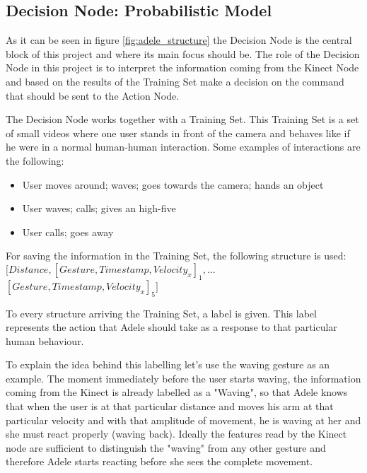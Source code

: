 

\subsection{Decision Node: Probabilistic Model}
As it can be seen in figure \ref{fig:adele_structure} the Decision Node is the central block of this project and where its main focus should be. The role of the Decision Node in this project is to interpret the information coming from the Kinect Node and based on the results of the Training Set make a decision on the command that should be sent to the Action Node.

The Decision Node works together with a Training Set. This Training Set is a set of small videos where one user stands in front of the camera and behaves like if he were in a normal human-human interaction. Some examples of interactions are the following:
\begin{itemize}
\item User moves around; waves; goes towards the camera; hands an object
\item User waves; calls; gives an high-five
\item User calls; goes away
\end{itemize}
For saving the information in the Training Set, the following structure is used:\\

$\big[Distance, [Gesture, Timestamp, Velocity_x]_1,...$\\$
[Gesture, Timestamp, Velocity_x]_5\big]$

To every structure arriving the Training Set, a label is given. This label represents the action that Adele should take as a response to that particular human behaviour.

To explain the idea behind this labelling let's use the waving gesture as an example. The moment immediately before the user starts waving, the information coming from the Kinect is already labelled as a "Waving", so that Adele knows that when the user is at that particular distance and moves his arm at that particular velocity and with that amplitude of movement, he is waving at her and she must react properly (waving back). Ideally the features read by the Kinect node are sufficient to distinguish the "waving" from any other gesture and therefore Adele starts reacting before she sees the complete movement.

